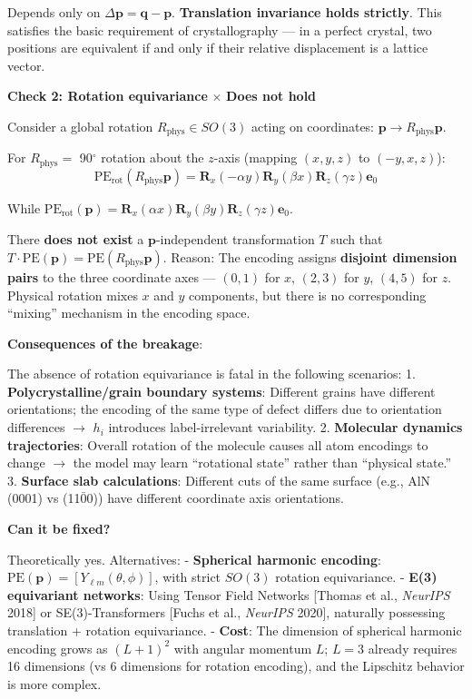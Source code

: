 \documentclass[
  12pt,
]{article}
\begin{document}
Depends only on $\Delta\mathbf{p} = \mathbf{q} - \mathbf{p}$. \textbf{Translation invariance holds strictly}. This satisfies the basic requirement of crystallography --- in a perfect crystal, two positions are equivalent if and only if their relative displacement is a lattice vector.

\textbf{Check 2: Rotation equivariance} $\times$ \textbf{Does not hold}

Consider a global rotation $R_{\text{phys}} \in SO(3)$ acting on coordinates: $\mathbf{p} \to R_{\text{phys}} \mathbf{p}$.

For $R_{\text{phys}} =$ 90$^\circ$ rotation about the $z$-axis (mapping $(x, y, z)$ to $(-y, x, z)$):
\[\text{PE}_{\text{rot}}(R_{\text{phys}}\mathbf{p}) = \mathbf{R}_x(-\alpha y) \mathbf{R}_y(\beta x) \mathbf{R}_z(\gamma z) \mathbf{e}_0\]

While $\text{PE}_{\text{rot}}(\mathbf{p}) = \mathbf{R}_x(\alpha x) \mathbf{R}_y(\beta y) \mathbf{R}_z(\gamma z) \mathbf{e}_0$.

There \textbf{does not exist} a $\mathbf{p}$-independent transformation $T$ such that $T \cdot \text{PE}(\mathbf{p}) = \text{PE}(R_{\text{phys}}\mathbf{p})$. Reason: The encoding assigns \textbf{disjoint dimension pairs} to the three coordinate axes --- $(0,1)$ for $x$, $(2,3)$ for $y$, $(4,5)$ for $z$. Physical rotation mixes $x$ and $y$ components, but there is no corresponding ``mixing'' mechanism in the encoding space.

\textbf{Consequences of the breakage}:

The absence of rotation equivariance is fatal in the following scenarios:
1. \textbf{Polycrystalline/grain boundary systems}: Different grains have different orientations; the encoding of the same type of defect differs due to orientation differences $\to$ $h_i$ introduces label-irrelevant variability.
2. \textbf{Molecular dynamics trajectories}: Overall rotation of the molecule causes all atom encodings to change $\to$ the model may learn ``rotational state'' rather than ``physical state.''
3. \textbf{Surface slab calculations}: Different cuts of the same surface (e.g., AlN (0001) vs (11$\bar{0}$0)) have different coordinate axis orientations.

\textbf{Can it be fixed?}

Theoretically yes. Alternatives:
- \textbf{Spherical harmonic encoding}: $\text{PE}(\mathbf{p}) = [Y_{\ell m}(\theta, \phi)]$, with strict $SO(3)$ rotation equivariance.
- \textbf{E(3) equivariant networks}: Using Tensor Field Networks [Thomas et al., \emph{NeurIPS} 2018] or SE(3)-Transformers [Fuchs et al., \emph{NeurIPS} 2020], naturally possessing translation + rotation equivariance.
- \textbf{Cost}: The dimension of spherical harmonic encoding grows as $(L+1)^2$ with angular momentum $L$; $L=3$ already requires 16 dimensions (vs 6 dimensions for rotation encoding), and the Lipschitz behavior is more complex.
\end{document}
